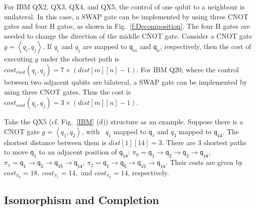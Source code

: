 \documentclass[runningheads]{llncs}
\begin{document}
For IBM QX2, QX3, QX4, and QX5, the control of one qubit to a neighbour is unilateral. In this case, 
a SWAP gate can be implemented by using three CNOT gates and four H gates, as shown in Fig.~\ref{f:Decomposition}. The four H gates are needed to change the direction of the middle CNOT gate. 
Consider a CNOT gate $g=\left \langle  \textit{q}_\textit{i},\textit{q}_\textit{j} \right \rangle $. If $q_i$ and $q_j$  are mapped to $\textsf{q}_{m}$ and $\textsf{q}_{n}$, respectively, then the cost of executing $g$ under the shortest path is $cost_{cnot}(\textit{q}_\textit{i},\textit{q}_\textit{j})=7 \times( dist[m][n]-1)$. For IBM Q20, where the control between two adjacent qubits are bilateral, a SWAP gate can be implemented by using three CNOT gates. Thus the cost  is $cost_{cnot}(\textit{q}_\textit{i},\textit{q}_\textit{j})=3 \times( dist[m][n]-1)$. 
\begin{example}
	Take the QX5 (cf. Fig.~\ref{IBM} (d))    structure  as an example. Suppose there is a CNOT gate $g=\left \langle  \textit{q}_\textit{1}, \textit{q}_\textit{2} \right \rangle $, with \ $\textit{q}_\textit{1}$ mapped to $\textsf{q}_{1}$ and $\textit{q}_\textit{2}$ mapped to $\textsf{q}_{\textsf{14}}$. The shortest distance between them  is $dist[1][14]=3$. There are 3 shortest paths to move $\textsf{q}_{\textsf{1}}$ to an adjacent position of 
$\textsf{q}_{\textsf{14}}$:
$\pi_{0}={\textsf{q}_{\textsf{1}}\rightarrow \textsf{q}_{\textsf{2}} \rightarrow \textsf{q}_{\textsf{3}} \rightarrow \textsf{q}_{\textsf{14}}}$,
$\pi_{1}={\textsf{q}_{\textsf{1}}\rightarrow \textsf{q}_{\textsf{2}} \rightarrow \textsf{q}_{\textsf{15}} \rightarrow \textsf{q}_{\textsf{14}}}$,
$\pi_{2}={\textsf{q}_{\textsf{1}}\rightarrow \textsf{q}_{\textsf{0}} \rightarrow \textsf{q}_{\textsf{15}} \rightarrow \textsf{q}_{\textsf{14}}}$.
Their costs are given by 
$cost_{\pi_{0}}=18,\ cost_{\pi_{1}}=14,$ and $ cost_{\pi_{2}}=14$, respectively.
\end{example}



\subsection{Isomorphism and Completion}
\end{document}
